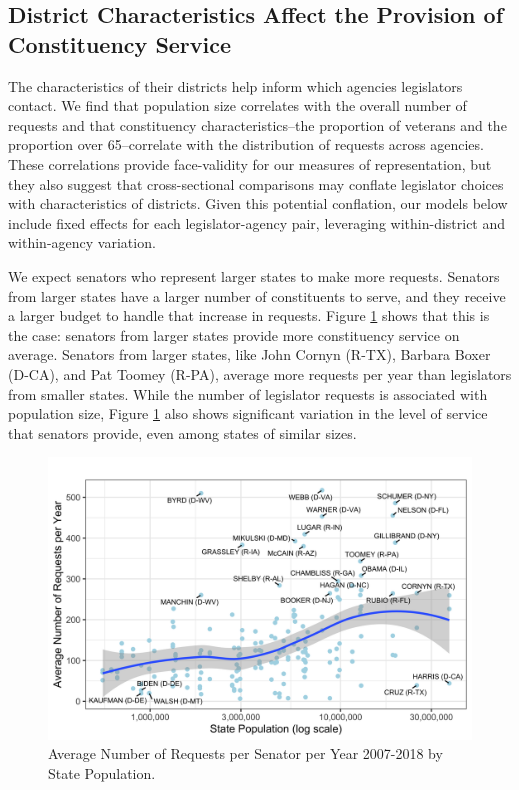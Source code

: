 \documentclass[12pt]{article}
\begin{document}
{\subsection{District Characteristics Affect the Provision of Constituency Service}

The characteristics of their districts help inform which agencies legislators contact. We find that population size correlates with the overall number of requests and that constituency characteristics--the proportion of veterans and the proportion over 65--correlate with the distribution of requests across agencies. These correlations provide face-validity for our measures of representation, but they also suggest that cross-sectional comparisons may conflate legislator choices with characteristics of districts. Given this potential conflation, our models below include fixed effects for each legislator-agency pair, leveraging within-district and within-agency variation.  

We expect senators who represent larger states to make more requests. Senators from larger states have a larger number of constituents to serve, and they receive a larger budget to handle that increase in requests.
Figure \ref{f:stateSize} shows that this is the case: senators from larger states provide more constituency service on average. Senators from larger states, like John Cornyn (R-TX), Barbara Boxer (D-CA), and Pat Toomey (R-PA), average more requests per year than legislators from smaller states. While the number of legislator requests is associated with population size, Figure \ref{f:stateSize} also shows significant variation in the level of service that senators provide, even among states of similar sizes.  

\begin{figure}
\centering
\caption{Average Number of Requests per Senator per Year 2007-2018 by State Population.} \label{f:stateSize}
\includegraphics[width = \textwidth]{figs/pop-1}
\end{figure}

}
\end{document}
